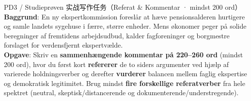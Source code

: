 \begin{emailbox}{PD3 / Studieprøven 实战写作任务（Referat \& Kommentar · mindst 200 ord）}
\textbf{Baggrund}: En ny ekspertkommission foreslår at hæve pensionsalderen hurtigere og samle landets sygehuse i færre, større enheder. Mens økonomer peger på solide beregninger af fremtidens arbejdsudbud, kalder fagforeninger og borgmestre forslaget for verdensfjernt ekspertvælde.\\[3pt]
\textbf{Opgave}: Skriv en \textbf{sammenhængende kommentar på 220--260 ord} (mindst 200 ord), hvor du først kort \textbf{refererer} de to siders argumenter ved hjælp af varierede holdningsverber og derefter \textbf{vurderer} balancen mellem faglig ekspertise og demokratisk legitimitet. Brug mindst \textbf{fire forskellige referatverber} fra hele spektret (neutral, skeptisk/distancerende og dokumenterende/understregende).
\end{emailbox}

